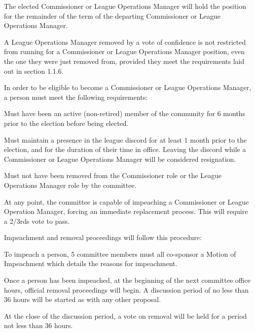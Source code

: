 \begin{deepEnumerate}
\begin{deepEnumerate}
\begin{deepEnumerate}
		\end{deepEnumerate}
		\item The elected Commissioner or League Operations Manager will hold the position for the remainder of the term of the departing Commissioner or League Operations Manager.
		\item A League Operations Manager removed by a vote of confidence is not restricted from running for a Commissioner or League Operations Manager position,
		even the one they were just removed from, provided they meet the requirements laid out in section 1.1.6.
	\end{deepEnumerate}
	\item In order to be eligible to become a Commissioner or League Operations Manager, a person must meet the following requirements:
	\begin{deepEnumerate}
		\item Must have been an active (non-retired) member of the community for 6 months prior to the election before being elected.
		\item Must maintain a presence in the league discord for at least 1 month prior to the election, and for the duration of their time in office. 
		Leaving the discord while a Commissioner or League Operations Manager will be considered resignation.
		\item Must not have been removed from the Commissioner role or the League Operations Manager role by the committee.	
	\end{deepEnumerate}
	\item At any point, the committee is capable of impeaching a Commissioner or League Operation Manager, forcing an immediate replacement process.
	This will require a 2/3rds vote to pass.
	\begin{deepEnumerate}
		\item Impeachment and removal proceedings will follow this procedure:
		\begin{deepEnumerate}
			\item To impeach a person, 5 committee members must all co-sponsor a Motion of Impeachment which details the reasons for impeachment.
			\item Once a person has been impeached, at the beginning of the next committee office hours, official removal proceedings will begin. 
			A discussion period of no less than 36 hours will be started as with any other proposal.
			\item At the close of the discussion period, a vote on removal will be held for a period not less than 36 hours. 

\end{deepEnumerate}
\end{deepEnumerate}
\end{deepEnumerate}
